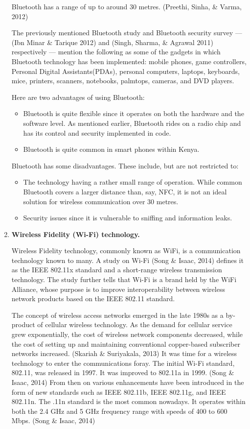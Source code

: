 \documentclass[12pt,svgnames,smaller]{article} %
\begin{document}
\begin{enumerate}
		Bluetooth has a range of up to around 30 metres. (Preethi, Sinha, \& Varma, 2012) 
		
		The previously mentioned Bluetooth study and Bluetooth security survey --– (Ibn Minar \& Tarique 2012) and  (Singh, Sharma, \& Agrawal 2011) respectively --- mention the following as some of the gadgets in which Bluetooth technology has been implemented: mobile phones, game controllers, Personal Digital Assistants(PDAs), personal computers, laptops, keyboards, mice, printers, scanners, notebooks, palmtops, cameras, and DVD players.
		
		Here are two advantages of using Bluetooth:
		
		\begin{itemize}
			\item Bluetooth is quite flexible since it operates on both the hardware and the software level. As mentioned earlier, Bluetooth rides on a radio chip and has its control and security implemented in code.
			\item Bluetooth is quite common in smart phones within Kenya. 
		\end{itemize}		
		
		Bluetooth has some disadvantages. These include, but are not restricted to:
		
		\begin{itemize}
			\item The technology having a rather small range of operation. While common Bluetooth covers a larger distance than, say, NFC, it is not an ideal solution for wireless communication over 30 metres.
			\item Security issues since it is vulnerable to sniffing and information leaks.
		\end{itemize}
		
		\item \textbf{ Wireless Fidelity (Wi-Fi) technology. }
		
		Wireless Fidelity technology, commonly known as WiFi, is a communication technology known to many. A study on Wi-Fi (Song \& Isaac, 2014) defines it as the IEEE 802.11x standard and a short-range wireless transmission technology. The study further tells that Wi-Fi is a brand held by the WiFi Alliance, whose purpose is to improve interoperability between wireless network products based on the IEEE 802.11 standard. 
		
		The concept of wireless access networks emerged in the late 1980s as a by-product of cellular wireless technology. As the demand for cellular service grew exponentially, the cost of wireless network components decreased, while the cost of setting up and maintaining conventional copper-based subscriber networks increased. (Skariah \& Suriyakala, 2013) It was time for a wireless technology to enter the communications foray. The initial Wi-Fi standard, 802.11, was released in 1997. It was improved to 802.11a in 1999. (Song \& Isaac, 2014) From then on various enhancements have been introduced in the form of new standards such as IEEE 802.11b, IEEE 802.11g, and IEEE 802.11n. The .11n standard is the most common nowadays. It operates within both the 2.4 GHz and 5 GHz frequency range with speeds of 400 to 600 Mbps. (Song \& Isaac, 2014) 
		

\end{enumerate}
\end{document}
